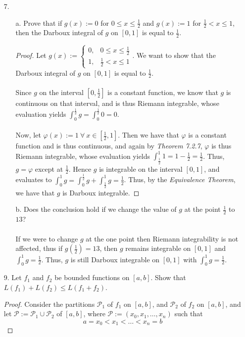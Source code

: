 \documentclass[12pt,letterpaper]{article}
\theoremstyle{case}
\theoremstyle{definition}
\begin{document}
\begin{enumerate}
\begin{enumerate}
\begin{proof}
			\end{proof}
			\item[7.]
			\begin{enumerate}
				\item[a.] Prove that if $g(x):=0$ for $0 \leq x \leq \frac{1}{2}$ and $g(x):=1$ for $\frac{1}{2} < x \leq 1$, then the Darboux integral of $g$ on $[0,1]$ is equal to $\frac{1}{2}$.
				\begin{proof}
					Let $g(x):=\begin{cases}
					0, &0 \leq x \leq \frac{1}{2} \\
					1, &\frac{1}{2} < x \leq 1
					\end{cases}$. We want to show that the Darboux integral of $g$ on $[0,1]$ is equal to $\frac{1}{2}$.
					\\\\Since $g$ on the interval $\left[0,\frac{1}{2}\right]$ is a constant function, we know that $g$ is continuous on that interval, and is thus Riemann integrable, whose evaluation yields $\displaystyle\int_{0}^{\frac{1}{2}} g = \int_{0}^{\frac{1}{2}} 0 = 0$. 
					\\\\Now, let $\varphi(x):= 1\ \forall\ x \in \left[\frac{1}{2},1\right]$. Then we have that $\varphi$ is a constant function and is thus continuous, and again by \textit{Theorem 7.2.7}, $\varphi$ is thus Riemann integrable, whose evaluation yields $\displaystyle\int_{\frac{1}{2}}^{1} 1 = 1-\frac{1}{2}=\frac{1}{2}$. Thus, $g=\varphi$ except at $\frac{1}{2}$. Hence $g$ is integrable on the interval $[0,1]$, and evaluates to $\displaystyle\int_{0}^{1} g = \int_{0}^{\frac{1}{2}} g + \int_{\frac{1}{2}}^{1} g = \frac{1}{2}$. Thus, by the \textit{Equivalence Theorem}, we have that $g$ is Darboux integrable.
				\end{proof}
				\item[b.] Does the conclusion hold if we change the value of $g$ at the point $\frac{1}{2}$ to $13$?
				\\\\If we were to change $g$ at the one point then Riemann integrability is not affected, thus if $g(\frac{1}{2})=13$, then $g$ remains integrable on $[0,1]$ and $\displaystyle\int_{0}^{1} g = \frac{1}{2}$. Thus, $g$ is still Darboux integrable on $[0,1]$ with $\displaystyle\int_{0}^{1} g = \frac{1}{2}$.\\
			\end{enumerate}
			\item[9.] Let $f_1$ and $f_2$ be bounded functions on $[a,b]$. Show that $L(f_1)+L(f_2) \leq L(f_1 + f_2)$.
			\begin{proof}
				Consider the partitions $\mathcal{P}_1$ of $f_1$ on $[a,b]$, and  $\mathcal{P}_2$ of $f_2$ on $[a,b]$, and let $\mathcal{P}:=\mathcal{P}_1 \cup \mathcal{P}_2$ of $[a,b]$, where $\mathcal{P}:=(x_0,x_1,\dots,x_n)$ such that
				\[a=x_0<x_1<\dots<x_n=b\]
				

\end{proof}
\end{enumerate}
\end{enumerate}
\end{document}
